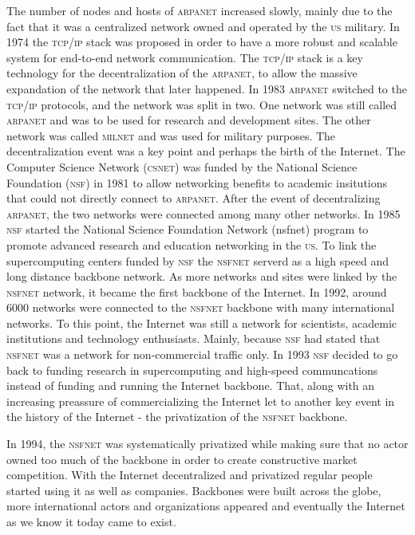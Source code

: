 \documentclass[a4paper,11pt]{kth-mag}
\begin{document}
        The number of nodes and hosts of \textsc{arpanet} increased slowly, mainly due to the fact that it was a centralized network owned and operated by the \textsc{us} military.
        In 1974 the \textsc{tcp/ip} stack was proposed in order to have a more robust and scalable system for end-to-end network communication.
        The \textsc{tcp/ip} stack is a key technology for the decentralization of the \textsc{arpanet}, to allow the massive expandation of the network that later happened.
        In 1983 \textsc{arpanet} switched to the \textsc{tcp/ip} protocols, and the network was split in two.
        One network was still called \textsc{arpanet} and was to be used for research and development sites.
        The other network was called \textsc{milnet} and was used for military purposes.
        The decentralization event was a key point and perhaps the birth of the Internet.
        The Computer Science Network (\textsc{csnet}) was funded by the National Science Foundation (\textsc{nsf}) in 1981 to allow networking benefits to academic insitutions that could not directly connect to \textsc{arpanet}.
        After the event of decentralizing \textsc{arpanet}, the two networks were connected among many other networks.
        In 1985 \textsc{nsf} started the National Science Foundation Network (nsfnet) program to promote advanced research and education networking in the \textsc{us}.
        To link the supercomputing centers funded by \textsc{nsf} the \textsc{nsfnet} serverd as a high speed and long distance backbone network.
        As more networks and sites were linked by the \textsc{nsfnet} network, it became the first backbone of the Internet.
        In 1992, around 6000 networks were connected to the \textsc{nsfnet} backbone with many international networks.
        To this point, the Internet was still a network for scientists, academic institutions and technology enthusiasts.
        Mainly, because \textsc{nsf} had stated that \textsc{nsfnet} was a network for non-commercial traffic only.
        In 1993 \textsc{nsf} decided to go back to funding research in supercomputing and high-speed communcations instead of funding and running the Internet backbone.
        That, along with an increasing preassure of commercializing the Internet let to another key event in the history of the Internet - the privatization of the \textsc{nsfnet} backbone.

        In 1994, the \textsc{nsfnet} was systematically privatized while making sure that no actor owned too much of the backbone in order to create constructive market competition.
        With the Internet decentralized and privatized regular people started using it as well as companies.
        Backbones were built across the globe, more international actors and organizations appeared and eventually the Internet as we know it today came to exist.
\end{document}
